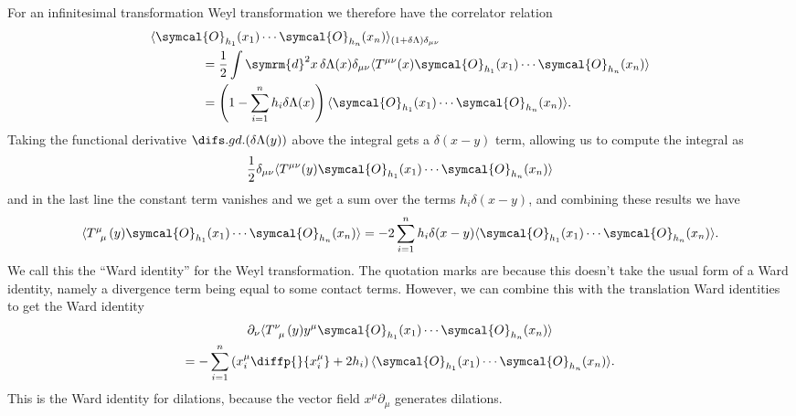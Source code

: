 \documentclass[fleqn]{NotesClass}
\renewcommand{\dl}[1]{\symrm{d}#1}
\newcommand{\quantumField}[1]{\symcal{#1}}
\DeclarePairedDelimiter{\correlator}{\langle}{\rangle}
\begin{document}
    For an infinitesimal transformation Weyl transformation we therefore have the correlator relation
    \begin{align}
        &\correlator{\quantumField{O}_{h_1}(x_1) \dotsm \quantumField{O}_{h_n}(x_n)}_{(1 + \delta\Lambda)\delta_{\mu\nu}}\\
        &\qquad\qquad= \frac{1}{2} \int \dl{^2x} \, \delta \Lambda(x) \delta_{\mu\nu}\correlator{T^{\mu\nu}(x)\quantumField{O}_{h_1}(x_1) \dotsm \quantumField{O}_{h_n}(x_n)}\\
        &\qquad\qquad= \left( 1 - \sum_{i=1}^n h_i \delta \Lambda(x) \right) \correlator{\quantumField{O}_{h_1}(x_1) \dotsm \quantumField{O}_{h_n}(x_n)}.
    \end{align}
    Taking the functional derivative \(\difsd{}{(\delta \Lambda(y))}\) above the integral gets a \(\delta(x - y)\) term, allowing us to compute the integral as
    \begin{equation}
        \frac{1}{2} \delta_{\mu\nu}\correlator{T^{\mu\nu}(y)\quantumField{O}_{h_1}(x_1) \dotsm \quantumField{O}_{h_n}(x_n)}
    \end{equation}
    and in the last line the constant term vanishes and we get a sum over the terms \(h_i \delta(x - y)\), and combining these results we have
    \begin{equation}
        \label{eqn:energy momentum tensor trace contact terms}
        \correlator{\tensor{T}{^\mu_\mu}(y)\quantumField{O}_{h_1}(x_1) \dotsm \quantumField{O}_{h_n}(x_n)} = -2 \sum_{i=1}^n h_i \delta(x - y) \correlator{\quantumField{O}_{h_1}(x_1) \dotsm \quantumField{O}_{h_n}(x_n)}.
    \end{equation}
    We call this the \enquote{Ward identity} for the Weyl transformation.
    The quotation marks are because this doesn't take the usual form of a Ward identity, namely a divergence term being equal to some contact terms.
    However, we can combine this with the translation Ward identities to get the Ward identity
    \begin{multline}
        \partial_\nu \correlator{\tensor{T}{^\nu_\mu}(y) y^\mu \quantumField{O}_{h_1}(x_1) \dotsm \quantumField{O}_{h_n}(x_n)}\\
        = -\sum_{i=1}^n \left( x_i^\mu \diffp{}{x_i^\mu} + 2h_i \right) \correlator{\quantumField{O}_{h_1}(x_1) \dotsm \quantumField{O}_{h_n}(x_n)}.
    \end{multline}
    This is the Ward identity for dilations, because the vector field \(x^\mu \partial_\mu\) generates dilations.
    
\end{document}
